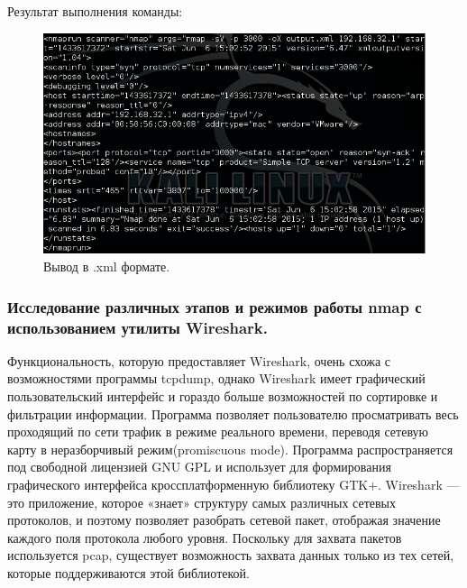 \documentclass[a4paper, 14pt]{article}				%
\begin{document}
Результат выполнения команды:
\begin{figure}[h!]
\centering
\includegraphics[width=\textwidth]{rsrc/nmap_xml}
\caption{Вывод в .xml формате.}
\end{figure}

\subsubsection{Исследование различных этапов и режимов работы nmap с использованием утилиты Wireshark.}
Функциональность, которую предоставляет Wireshark, очень схожа с возможностями программы tcpdump, однако Wireshark имеет графический пользовательский интерфейс и гораздо больше возможностей по сортировке и фильтрации информации. Программа позволяет пользователю просматривать весь проходящий по сети трафик в режиме реального времени, переводя сетевую карту в неразборчивый режим(promiscuous mode). Программа распространяется под свободной лицензией GNU GPL и использует для формирования графического интерфейса кроссплатформенную библиотеку GTK+. Wireshark — это приложение, которое «знает» структуру самых различных сетевых протоколов, и поэтому позволяет разобрать сетевой пакет, отображая значение каждого поля протокола любого уровня. Поскольку для захвата пакетов используется pcap, существует возможность захвата данных только из тех сетей, которые поддерживаются этой библиотекой.
\end{document}
